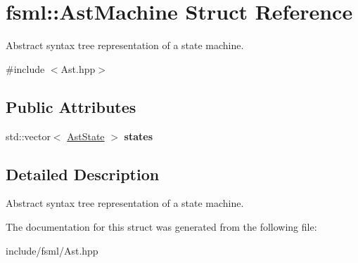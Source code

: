 \hypertarget{structfsml_1_1AstMachine}{\section{fsml\-:\-:Ast\-Machine Struct Reference}
\label{structfsml_1_1AstMachine}
}


Abstract syntax tree representation of a state machine.  




{\ttfamily \#include $<$Ast.\-hpp$>$}

\subsection*{Public Attributes}
\begin{DoxyCompactItemize}
\item 
\hypertarget{structfsml_1_1AstMachine_a007b560f2e500f7f51c570f0316843e2}{std\-::vector$<$ \hyperlink{structfsml_1_1AstState}{Ast\-State} $>$ {\bfseries states}}\label{structfsml_1_1AstMachine_a007b560f2e500f7f51c570f0316843e2}

\end{DoxyCompactItemize}


\subsection{Detailed Description}
Abstract syntax tree representation of a state machine. 



The documentation for this struct was generated from the following file\-:\begin{DoxyCompactItemize}
\item 
include/fsml/Ast.\-hpp\end{DoxyCompactItemize}
